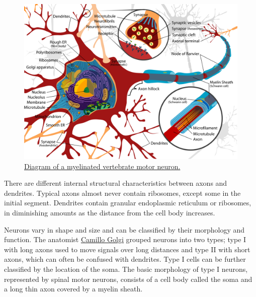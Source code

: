 \begin{figure}

{\centering \includegraphics[width=0.7\linewidth]{./figures/cells/Complete_neuron_cell_diagram_en} 

}

\caption{\href{https://commons.wikimedia.org/wiki/File:Complete_neuron_cell_diagram_en.svg}{Diagram of a myelinated vertebrate motor neuron.}}\label{fig:motorneuron}
\end{figure}

There are different internal structural characteristics between axons and dendrites. Typical axons almost never contain ribosomes, except some in the initial segment. Dendrites contain granular endoplasmic reticulum or ribosomes, in diminishing amounts as the distance from the cell body increases.

Neurons vary in shape and size and can be classified by their morphology and function. The anatomist \href{https://en.wikipedia.org/wiki/Camillo_Golgi}{Camillo Golgi} grouped neurons into two types; type I with long axons used to move signals over long distances and type II with short axons, which can often be confused with dendrites. Type I cells can be further classified by the location of the soma. The basic morphology of type I neurons, represented by spinal motor neurons, consists of a cell body called the soma and a long thin axon covered by a myelin sheath.



